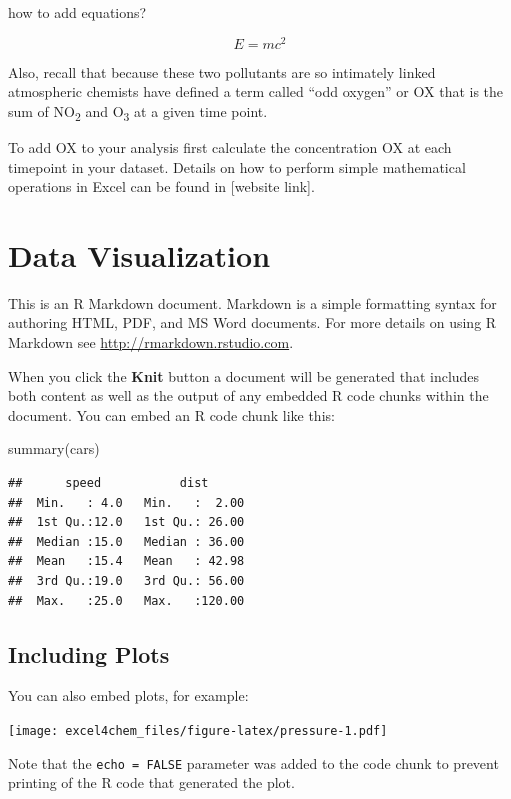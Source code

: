 \documentclass[
]{book}
\newenvironment{Shaded}{\begin{snugshade}}{\end{snugshade}}
\newcommand{\FunctionTok}[1]{\textcolor[rgb]{0.00,0.00,0.00}{#1}}
\newcommand{\NormalTok}[1]{#1}
\begin{document}
how to add equations?

\[E = mc^2\]

Also, recall that because these two pollutants are so intimately linked atmospheric chemists have defined a term called ``odd oxygen'' or OX that is the sum of NO\textsubscript{2} and O\textsubscript{3} at a given time point.

To add OX to your analysis first calculate the concentration OX at each timepoint in your dataset. Details on how to perform simple mathematical operations in Excel can be found in {[}website link{]}.

\hypertarget{data-visualization}{%
\chapter{Data Visualization}\label{data-visualization}}

This is an R Markdown document. Markdown is a simple formatting syntax for authoring HTML, PDF, and MS Word documents. For more details on using R Markdown see \url{http://rmarkdown.rstudio.com}.

When you click the \textbf{Knit} button a document will be generated that includes both content as well as the output of any embedded R code chunks within the document. You can embed an R code chunk like this:

\begin{Shaded}
\begin{Highlighting}[]
\FunctionTok{summary}\NormalTok{(cars)}
\end{Highlighting}
\end{Shaded}

\begin{verbatim}
##      speed           dist       
##  Min.   : 4.0   Min.   :  2.00  
##  1st Qu.:12.0   1st Qu.: 26.00  
##  Median :15.0   Median : 36.00  
##  Mean   :15.4   Mean   : 42.98  
##  3rd Qu.:19.0   3rd Qu.: 56.00  
##  Max.   :25.0   Max.   :120.00
\end{verbatim}

\hypertarget{including-plots}{%
\section{Including Plots}\label{including-plots}}

You can also embed plots, for example:

\texttt{[image: excel4chem\_files/figure-latex/pressure-1.pdf]}

Note that the \texttt{echo\ =\ FALSE} parameter was added to the code chunk to prevent printing of the R code that generated the plot.
\end{document}
